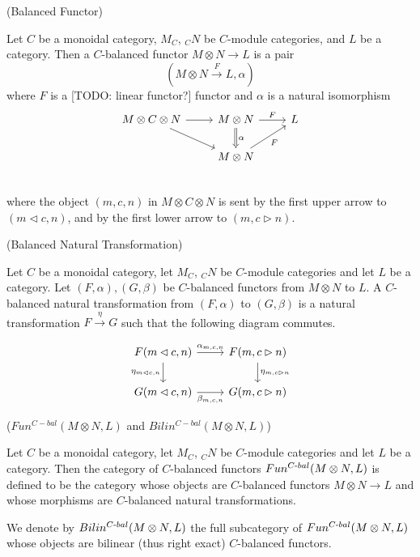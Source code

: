 \begin{definition} (Balanced Functor)

  \noindent Let $C$ be a monoidal category, $M_{C}$, $_{C}N$ be $C$-module categories, and $L$ be a category. \quad Then a
  $C$-balanced functor $M \otimes N\to L$
  is a pair
  \[(M \otimes N \xrightarrow{F} L, \alpha)\] where $F$ is a [TODO: linear functor?] functor and $\alpha$ is a natural isomorphism
  \[
    \begin{tikzcd}
      M \otimes C \otimes N \arrow[r] \arrow[dr] &
      M \otimes N \arrow[d, Rightarrow, "\alpha"] \arrow[r, "F"] &
      L \\
      & M \otimes N \arrow[ur, "F"'] \\
    \end{tikzcd}
  \]
  where the object $(m,c,n)$ in $M \otimes C \otimes N$ is sent by the first
  upper arrow to $(m \lhd c, n)$, and by the first lower arrow to $(m, c \rhd n)$.
\end{definition}


\begin{definition} (Balanced Natural Transformation)

  \noindent Let $C$ be a monoidal category, let $M_{C}$, $_{C}N$ be $C$-module categories and let $L$ be a category. Let $(F,\alpha), (G,\beta)$ be $C$-balanced functors from $M \otimes N$ to $L$. A $C$-balanced natural transformation
  from $(F,\alpha)$ to $(G,\beta)$ is a natural transformation $ F \xrightarrow{\eta} G$ such
  that the following diagram commutes.

  \[
    \begin{tikzcd}
      F(m \lhd c, n) \arrow[r, "\alpha_{m,c,n}"] \arrow[d, "\eta_{m \lhd c, n}"'] &
      F(m, c \rhd n) \arrow[d, "\eta_{m, c \rhd n}"] \\
      G(m \lhd c, n) \arrow[r, "\beta_{m,c,n}"'] &
      G(m, c \rhd n)
    \end{tikzcd}
  \]
\end{definition}

\begin{definition} ($Fun^{C-bal}(M \otimes N, L)$ and $Bilin^{C-bal}(M \otimes N, L)$)

  \noindent Let $C$ be a monoidal category, let $M_{C}$, $_{C}N$ be $C$-module categories and let $L$ be a category. \quad Then the category of $C$-balanced functors
  $Fun^{C{\text -}bal}(M \otimes N, L)$ is defined to be the category whose
  objects are $C$-balanced functors
  $M \otimes N \to L$ and whose morphisms are $C$-balanced natural transformations.

 We denote by $Bilin^{C{\text -}bal}(M \otimes N, L)$ the full subcategory of $Fun^{C{\text -}bal}(M \otimes N, L)$ whose objects are bilinear (thus right exact) $C$-balanced functors.
\end{definition}


